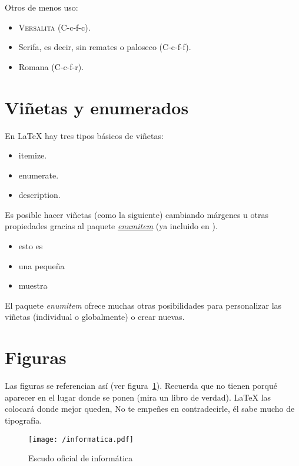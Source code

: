 Otros de menos uso:

\begin{itemize}
\item \textsc{Versalita} (C-c-f-c).
\item \textsf{Serifa}, es decir, sin remates o paloseco (C-c-f-f).
\item \textrm{Romana} (C-c-f-r).
\end{itemize}


\section{Viñetas y enumerados}

En \LaTeX{} hay tres tipos básicos de viñetas:

\begin{itemize}
\item itemize.
\item enumerate.
\item description.
\end{itemize}


Es posible hacer viñetas (como la siguiente) cambiando márgenes u otras
propiedades gracias al paquete \href{http://mirror.ctan.org/macros/latex/contrib/enumitem/enumitem.pdf}{\emph{enumitem}}
(ya incluido en \arcopfc).

\begin{itemize}[noitemsep, label=$\triangleright$]
\item esto es
\item una pequeña
\item muestra
\end{itemize}

El paquete \emph{enumitem} ofrece muchas otras posibilidades para personalizar
las viñetas (individual o globalmente) o crear nuevas.


\section{Figuras}

Las figuras se referencian así (ver figura~\ref{fig:informatica}). Recuerda que
no tienen porqué aparecer en el lugar donde se ponen (mira un libro de
verdad). \LaTeX{} las colocará donde mejor queden, No te empeñes en
contradecirle, él sabe mucho de tipografía.

\begin{figure}[!h]
\begin{center}
\texttt{[image: /informatica.pdf]}
\caption{Escudo oficial de informática}
\label{fig:informatica}
\end{center}
\end{figure}

